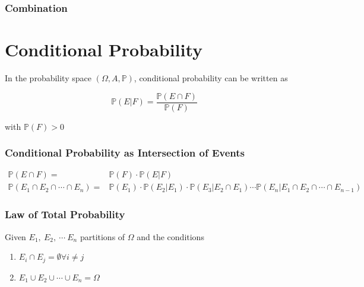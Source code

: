         \subsubsection{Combination}


\section{Conditional Probability}

    In the probability space \( ( \Omega, A, \mathbb{P}) \), conditional probability can be written as

    \begin{equation}
        \mathbb{P} (E|F) = \frac{\mathbb{P} (E \cap F)}{\mathbb{P} (F)}
    \end{equation}

    \noindent
    with \(\mathbb{P} (F) > 0\)

        \subsubsection{Conditional Probability as Intersection of Events}

            \begin{equation}
            \begin{split}
                \mathbb{P} (E \cap F) = & \mathbb{P} (F) \cdot \mathbb{P} (E | F) \\
                \mathbb{P} (E_1 \cap E_2 \cap \cdots \cap E_n ) = & \mathbb{P} (E_1) \cdot \mathbb{P} (E_2 | E_1) \cdot \mathbb{P} (E_3 | E_2 \cap E_1) \cdots \mathbb{P} (E_n | E_1 \cap E_2 \cap \cdots \cap E_{n-1})
            \end{split}
            \end{equation}

        \subsubsection{Law of Total Probability}

            Given \(E_1, \ E_2, \ \cdots \ E_n\) partitions of \(\Omega\) and the conditions

            \begin{enumerate}
                \item \(E_i \cap E_j = \emptyset \forall i \neq j\)
                \item \(E_1 \cup E_2 \cup \cdots \cup E_n = \Omega\)
            \end{enumerate}

